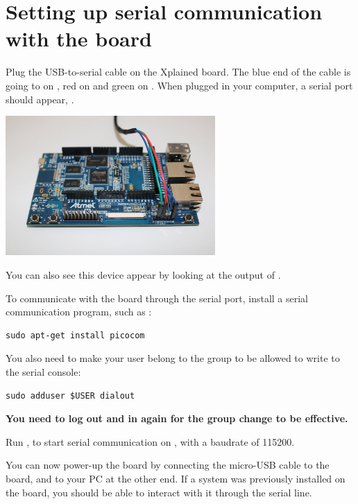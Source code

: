 \section{Setting up serial communication with the board}

Plug the USB-to-serial cable on the Xplained board. The blue end of
the cable is going to  on , red on  and
green on . When plugged in your computer, a serial port
should appear, .

\begin{center}
\includegraphics[width=8cm]{labs/sysdev-u-boot/xplained-serial-connector.jpg}
\end{center}

You can also see this device appear by looking at the output of
.

To communicate with the board through the serial port, install a
serial communication program, such as :

\begin{verbatim}
sudo apt-get install picocom
\end{verbatim}

You also need to make your user belong to the  group to be
allowed to write to the serial console:

\begin{verbatim}
sudo adduser $USER dialout
\end{verbatim}

{\bf You need to log out and in again for the group change to be
effective.}

Run , to start serial
communication on , with a baudrate of 115200.

You can now power-up the board by connecting the micro-USB cable to 
the board, and to your PC at the other end. If a system was previously
installed on the board, you should be able to interact with it
through the serial line.

